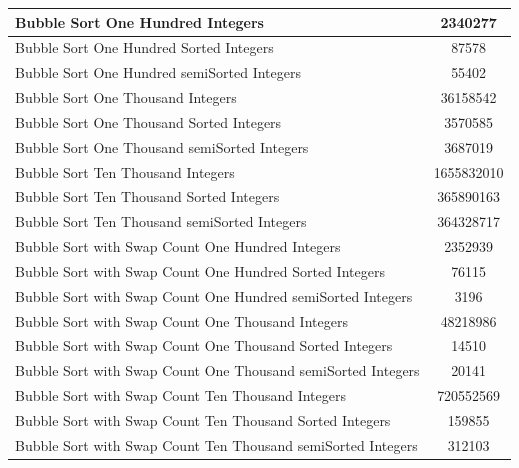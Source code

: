 \documentclass[]{article}
\begin{document}
	\begin{tabular}{|l|c|}
		\hline
		Bubble Sort One Hundred Integers & 2340277\\
		\hline
		Bubble Sort One Hundred Sorted Integers & 87578\\
		\hline
		Bubble Sort One Hundred semiSorted Integers & 55402\\
		\hline
		Bubble Sort One Thousand Integers & 36158542\\
		\hline
		Bubble Sort One Thousand Sorted Integers & 3570585\\
		\hline
		Bubble Sort One Thousand semiSorted Integers & 3687019\\
		\hline
		Bubble Sort Ten Thousand Integers & 1655832010\\
		\hline
		Bubble Sort Ten Thousand Sorted Integers & 365890163\\
		\hline
		Bubble Sort Ten Thousand semiSorted Integers & 364328717\\
		\hline
		Bubble Sort with Swap Count One Hundred Integers & 2352939\\
		\hline
		Bubble Sort with Swap Count One Hundred Sorted Integers & 76115\\
		\hline
		Bubble Sort with Swap Count One Hundred semiSorted Integers & 3196\\
		\hline
		Bubble Sort with Swap Count One Thousand Integers & 48218986\\
		\hline
		Bubble Sort with Swap Count One Thousand Sorted Integers & 14510\\
		\hline
		Bubble Sort with Swap Count One Thousand semiSorted Integers & 20141\\
		\hline
		Bubble Sort with Swap Count Ten Thousand Integers & 720552569\\
		\hline
		Bubble Sort with Swap Count Ten Thousand Sorted Integers & 159855\\
		\hline
		Bubble Sort with Swap Count Ten Thousand semiSorted Integers & 312103\\
		\hline
	\end{tabular}
\end{document}
